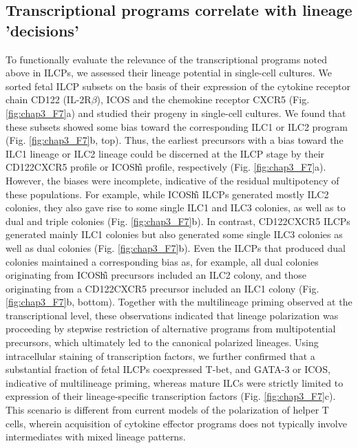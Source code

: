 \subsection{Transcriptional programs correlate with lineage 'decisions'}

To functionally evaluate the relevance of the transcriptional programs noted above in ILCPs, we assessed their lineage potential in single-cell cultures. We sorted fetal ILCP subsets on the basis of their expression of the cytokine receptor chain CD122 (IL-2R$\beta$), ICOS and the chemokine receptor CXCR5 (Fig. \ref{fig:chap3_F7}a) and studied their progeny in single-cell cultures. We found that these subsets showed some bias toward the corresponding ILC1 or ILC2 program (Fig. \ref{fig:chap3_F7}b, top). Thus, the earliest precursors with a bias toward the ILC1 lineage or ILC2 lineage could be discerned at the ILCP stage by their CD122\UP CXCR5\UM{} profile or ICOS\U{hi} profile, respectively (Fig. \ref{fig:chap3_F7}a). However, the biases were incomplete, indicative of the residual multipotency of these populations. For example, while ICOS\U{hi} ILCPs generated mostly ILC2 colonies, they also gave rise to some single ILC1 and ILC3 colonies, as well as to dual and triple colonies (Fig. \ref{fig:chap3_F7}b). In contrast, CD122\UP CXCR5\UM{} ILCPs generated mainly ILC1 colonies but also generated some single ILC3 colonies as well as dual colonies (Fig. \ref{fig:chap3_F7}b). Even the ILCPs that produced dual colonies maintained a corresponding bias as, for example, all dual colonies originating from ICOS\U{hi} precursors included an ILC2 colony, and those originating from a CD122\UP CXCR5\UM{} precursor included an ILC1 colony (Fig. \ref{fig:chap3_F7}b, bottom). Together with the multilineage priming observed at the transcriptional level, these observations indicated that lineage polarization was proceeding by stepwise restriction of alternative programs from multipotential precursors, which ultimately led to the canonical polarized lineages. Using intracellular staining of transcription factors, we further confirmed that a substantial fraction of fetal ILCPs coexpressed T-bet, \RORgt{} and GATA-3 or ICOS, indicative of multilineage priming, whereas mature ILCs were strictly limited to expression of their lineage-specific transcription factors (Fig. \ref{fig:chap3_F7}c). This scenario is different from current models of the polarization of helper T cells, wherein acquisition of cytokine effector programs does not typically involve intermediates with mixed lineage patterns.

